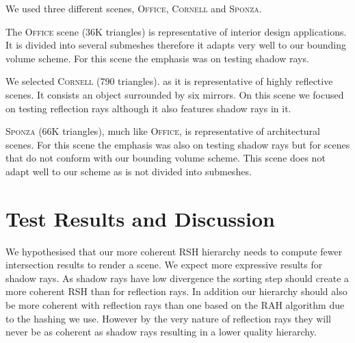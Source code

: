 We used three different scenes, \textsc{Office}, \textsc{Cornell} and \textsc{Sponza}.

The \textsc{Office} scene (36K triangles) is representative of interior design applications. It is divided into several submeshes therefore it adapts very well to our bounding volume scheme. For this scene the emphasis was on testing shadow rays. 

We selected \textsc{Cornell} (790 triangles). as it is representative of highly reflective scenes. It consists an object surrounded by six mirrors. On this scene we focused on testing reflection rays although it also features shadow rays in it.

\textsc{Sponza} (66K triangles), much like \textsc{Office}, is representative of architectural scenes. For this scene the emphasis was also on testing shadow rays but for scenes that do not conform with our bounding volume scheme. This scene does not adapt well to our scheme as is not divided into submeshes. 

\section{Test Results and Discussion}
\label{section:test-results-and-discussion}

We hypothesised that our more coherent RSH hierarchy needs to compute fewer intersection results to render a scene. We expect more expressive results for shadow rays. As shadow rays have low divergence the sorting step should create a more coherent RSH than for reflection rays. In addition our hierarchy should also be more coherent with reflection rays than one based on the RAH algorithm due to the hashing we use. However by the very nature of reflection rays they will never be as coherent as shadow rays resulting in a lower quality hierarchy.

